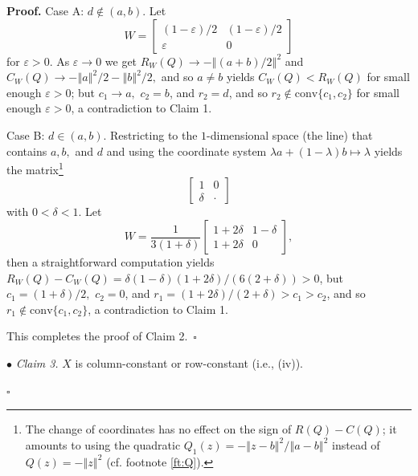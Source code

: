 \documentclass[12pt,a4paper,notitlepage]{article}
\newenvironment{proof}[1][Proof]{\noindent\textbf{#1.} }{\hfill $\square$}
\begin{document}
\begin{proof}
Case A: $d\notin (a,b).$ Let 
\begin{equation*}
W=\left[ 
\begin{array}{cc}
(1-\varepsilon )/2 & (1-\varepsilon )/2 \\ 
\varepsilon  & 0%
\end{array}%
\right] 
\end{equation*}
for $\varepsilon >0$. As $\varepsilon \rightarrow 0$ we get $%
R_{W}(Q)\rightarrow -\left\Vert (a+b)/2\right\Vert ^{2}$ and $%
C_{W}(Q)\rightarrow -\left\Vert a\right\Vert ^{2}/2-\left\Vert b\right\Vert
^{2}/2,$ and so $a\neq b$ yields $C_{W}(Q)<R_{W}(Q)$ for small enough $%
\varepsilon >0$; but $c_{1}\rightarrow a,$ $c_{2}=b$, and $r_{2}=d$, and so $%
r_{2}\notin \mathrm{conv}\{c_{1},c_{2}\}$ for small enough $\varepsilon >0$,
a contradiction to Claim 1.

Case B: $d\in (a,b)$. Restricting to the $1$-dimensional space (the line)
that contains $a,b,$ and $d$ and using the coordinate system $\lambda
a+(1-\lambda )b\mapsto \lambda $ yields the matrix\footnote{%
The change of coordinates has no effect on the sign of $R(Q)-C(Q)$; it
amounts to using the quadratic $Q_{1}(z)=-\left\Vert z-b\right\Vert
^{2}/\left\Vert a-b\right\Vert ^{2}$ instead of $Q(z)=-\left\Vert
z\right\Vert ^{2}$ (cf. footnote \ref{ft:Q}).} 
\begin{equation*}
\left[ 
\begin{array}{cc}
1 & 0 \\ 
\delta  & \cdot 
\end{array}%
\right] 
\end{equation*}
with $0<\delta <1.$ Let 
\begin{equation*}
W=\frac{1}{3(1+\delta )}\left[ 
\begin{array}{cc}
1+2\delta  & 1-\delta  \\ 
1+2\delta  & 0%
\end{array}%
\right] ,
\end{equation*}
then a straightforward computation yields $R_{W}(Q)-C_{W}(Q)=\delta
(1-\delta )(1+2\delta )/(6(2+\delta ))>0$, but $c_{1}=(1+\delta )/2,$ $%
c_{2}=0$, and $r_{1}=(1+2\delta )/(2+\delta )>c_{1}>c_{2}$, and so $%
r_{1}\notin \mathrm{conv}\{c_{1},c_{2}\}$, a contradiction to Claim 1.

This completes the proof of Claim 2.~$\square $

$\bullet $ \emph{Claim 3.} $X$ is column-constant or row-constant (i.e.,
(iv)).


\end{proof}
\end{document}

